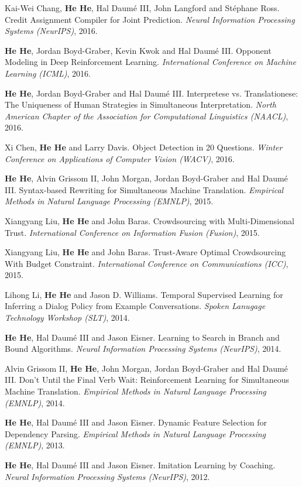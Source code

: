 Kai-Wei Chang, \textbf{He He}, Hal Daum\'e III, John Langford and St\'ephane Ross. Credit Assignment Compiler for Joint Prediction. \textit{Neural Information Processing Systems (NeurIPS)}, 2016.

\textbf{He He}, Jordan Boyd-Graber, Kevin Kwok and Hal Daum\'e III. Opponent Modeling in Deep Reinforcement Learning. \textit{International Conference on Machine Learning (ICML)}, 2016.

\textbf{He He}, Jordan Boyd-Graber and Hal Daum\'e III. Interpretese vs. Translationese: The Uniqueness of Human Strategies in Simultaneous Interpretation. \textit{North American Chapter of the Association for Computational Linguistics (NAACL)}, 2016.

Xi Chen, \textbf{He He} and Larry Davis. Object Detection in 20 Questions. \textit{Winter Conference on Applications of Computer Vision (WACV)}, 2016.

\textbf{He He}, Alvin Grissom II, John Morgan, Jordan Boyd-Graber and Hal Daum\'e III. Syntax-based Rewriting for Simultaneous Machine Translation. \textit{Empirical Methods in Natural Language Processing (EMNLP)}, 2015.

Xiangyang Liu, \textbf{He He} and John Baras. Crowdsourcing with Multi-Dimensional Trust. \textit{International Conference on Information Fusion (Fusion)}, 2015.

Xiangyang Liu, \textbf{He He} and John Baras. Trust-Aware Optimal Crowdsourcing With Budget Constraint. \textit{International Conference on Communications (ICC)}, 2015.

Lihong Li, \textbf{He He} and Jason D. Williams. Temporal Supervised Learning for Inferring a Dialog Policy from Example Conversations. \textit{Spoken Lanugage Technology Workshop (SLT)}, 2014.

\textbf{He He}, Hal Daum\'e III and Jason Eisner. Learning to Search in Branch and Bound Algorithms. \textit{Neural Information Processing Systems (NeurIPS)}, 2014.

Alvin Grissom II, \textbf{He He}, John Morgan, Jordan Boyd-Graber and Hal Daum\'e III. Don't Until the Final Verb Wait: Reinforcement Learning for Simultaneous Machine Translation. \textit{Empirical Methods in Natural Language Processing (EMNLP)}, 2014.

\textbf{He He}, Hal Daum\'e III and Jason Eisner. Dynamic Feature Selection for Dependency Parsing. \textit{Empirical Methods in Natural Language Processing (EMNLP)}, 2013.

\textbf{He He}, Hal Daum\'e III and Jason Eisner. Imitation Learning by Coaching. \textit{Neural Information Processing Systems (NeurIPS)}, 2012.


